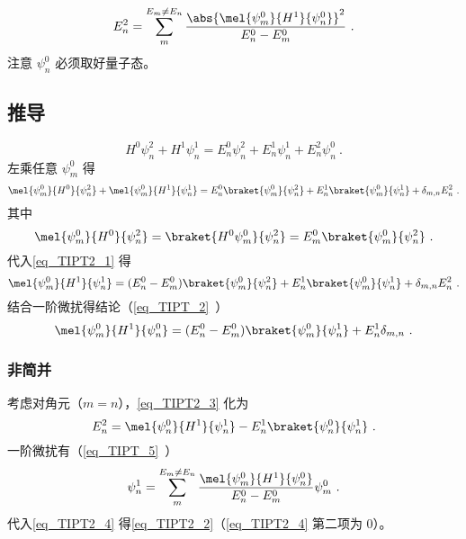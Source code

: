
\begin{issues}
\issueDraft
\end{issues}


\begin{equation}\label{eq_TIPT2_2}
E_n^2 = \sum_{m}^{E_m\ne E_n} \frac{\abs{\mel{\psi_m^0}{H^1}{\psi_n^0}}^2}{E_n^0-E_m^0}~.
\end{equation}
注意 $\psi_n^0$ 必须取好量子态。

\subsection{推导}
\begin{equation}
H^0\psi_n^2 + H^1\psi_n^1 = E_n^0\psi_n^2 + E_n^1\psi_n^1 + E_n^2\psi_n^0~.
\end{equation}
左乘任意 $\psi_m^0$ 得
\begin{equation}\label{eq_TIPT2_1}
\mel{\psi_m^0}{H^0}{\psi_n^2} + \mel{\psi_m^0}{H^1}{\psi_n^1} = E_n^0\braket{\psi_m^0}{\psi_n^2} + E_n^1\braket{\psi_m^0}{\psi_n^1} + \delta_{m,n}E_n^2~.
\end{equation}
其中
\begin{equation}
\mel{\psi_m^0}{H^0}{\psi_n^2} = \braket{H^0\psi_m^0}{\psi_n^2} = E_m^0\braket{\psi_m^0}{\psi_n^2}~.
\end{equation}
代入\autoref{eq_TIPT2_1} 得
\begin{equation}\label{eq_TIPT2_3}
\mel{\psi_m^0}{H^1}{\psi_n^1} = (E_n^0-E_m^0)\braket{\psi_m^0}{\psi_n^2} + E_n^1\braket{\psi_m^0}{\psi_n^1} + \delta_{m,n}E_n^2~.
\end{equation}
结合一阶微扰得结论（\autoref{eq_TIPT_2}~）
\begin{equation}
\mel{\psi_m^0}{H^1}{\psi_n^0} = (E_n^0 - E_m^0) \braket{\psi_m^0}{\psi_n^1} + E_n^1 \delta_{m,n}~.
\end{equation}

\subsubsection{非简并}
考虑对角元（$m=n$），\autoref{eq_TIPT2_3} 化为
\begin{equation}\label{eq_TIPT2_4}
E_n^2 = \mel{\psi_n^0}{H^1}{\psi_n^1} - E_n^1\braket{\psi_n^0}{\psi_n^1}~.
\end{equation}
一阶微扰有（\autoref{eq_TIPT_5}~）
\begin{equation}
\psi_n^1 = \sum_m^{E_m\ne E_n} \frac{\mel{\psi_m^0}{H^1}{\psi_n^0}}{E_n^0 - E_m^0}\psi_m^0~.
\end{equation}
代入\autoref{eq_TIPT2_4} 得\autoref{eq_TIPT2_2}（\autoref{eq_TIPT2_4} 第二项为 0）。


